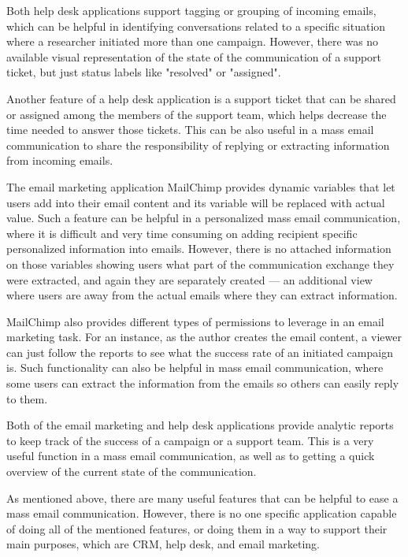 \begin{compactitem}
	\item Both help desk applications support tagging or grouping of incoming emails, which can be helpful in identifying conversations related to a specific situation where a researcher initiated more than one campaign. However, there was no available visual representation of the state of the communication of a support ticket, but just status labels like "resolved" or "assigned".
	\item Another feature of a help desk application is a support ticket that can be shared or assigned among the members of the support team, which helps decrease the time needed to answer those tickets. This can be also useful in a mass email communication to share the responsibility of replying or extracting information from incoming emails.
	\item The email marketing application MailChimp provides dynamic variables that let users add into their email content and its variable will be replaced with actual value. Such a feature can be helpful in a personalized mass email communication, where it is difficult and very time consuming on adding recipient specific personalized information into emails. However, there is no attached information on those variables showing users what part of the communication exchange they were extracted, and again they are separately created --- an additional view where users are away from the actual emails where they can extract information.
	\item MailChimp also provides different types of permissions to leverage in an email marketing task. For an instance, as the author creates the email content, a viewer can just follow the reports to see what the success rate of an initiated campaign is. Such functionality can also be helpful in mass email communication, where some users can extract the information from the emails so others can easily reply to them.
	\item Both of the email marketing and help desk applications provide analytic reports to keep track of the success of a campaign or a support team. This is a very useful function in a mass email communication, as well as to getting a quick overview of the current state of the communication.
\end{compactitem}

As mentioned above, there are many useful features that can be helpful to ease a mass email communication. However, there is no one specific application capable of doing all of the mentioned features, or doing them in a way to support their main purposes, which are \ac{CRM}, help desk, and email marketing.

